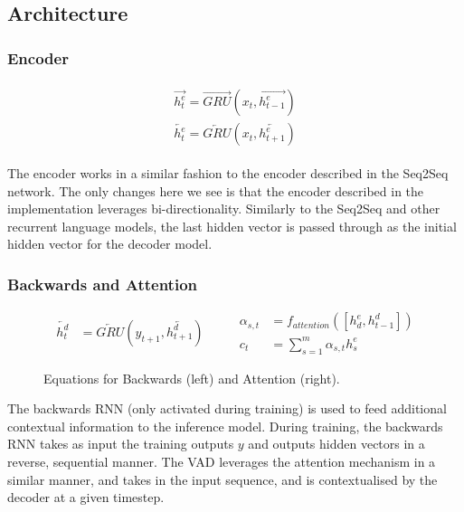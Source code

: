 \documentclass[12pt,twoside]{report}
\begin{document}
\subsection{Architecture}

\subsubsection{Encoder}

\begin{align}
\label{eqn:eqlabel}
\begin{split}
	\overrightarrow{h^e_t} = \overrightarrow{GRU}(x_t, \overrightarrow{h^e_{t-1}})
\\
\overleftarrow{h^e_t} = \overleftarrow{GRU}(x_t, \overleftarrow{h^e_{t+1}})
\end{split}
\end{align}

The encoder works in a similar fashion to the encoder described in the Seq2Seq network. The only changes here we see is that the encoder described in the implementation leverages bi-directionality. Similarly to the Seq2Seq and other recurrent language models, the last hidden vector is passed through as the initial hidden vector for the decoder model.

\subsubsection{Backwards and Attention}


\begin{figure}[!ht]
	\label{eqn:eqback}
	\begin{equation}
		\begin{split}
			\overleftarrow{h^d_t} &= \overleftarrow{GRU}(y_{t+1}, \overleftarrow{h^d_{t+1}})
		\end{split}
		\quad\quad
		\begin{split}
			\alpha_{s,t} &= f_{attention}([h^e_d, h^d_{t-1}]) \\
			c_t &= \sum^m_{s=1}\alpha_{s,t} h^e_s
		\end{split}
	\end{equation}
	\caption{Equations for Backwards (left) and Attention (right).}
	\end{figure}


The backwards RNN (only activated during training) is used to feed additional contextual information to the inference model.  During training, the backwards RNN takes as input the training outputs $y$ and outputs hidden vectors in a reverse, sequential manner. The VAD leverages the attention mechanism in a similar manner, and takes in the input sequence, and is contextualised by the decoder at a given timestep.
\end{document}
